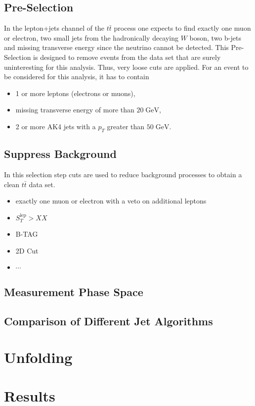 \subsection{Pre-Selection}
\label{sec:PreSel}
	In the lepton+jets channel of the $t\bar{t}$ process one expects to find exactly one muon or electron, two small jets from the hadronically decaying $W$ boson, two b-jets and missing transverse energy since the neutrino cannot be detected. This Pre-Selection is designed to remove events from the data set that are surely uninteresting for this analysis. Thus, very loose cuts are applied. For an event to be considered for this analysis, it has to contain
	\begin{itemize}
	\item 1 or more leptons (electrons or muons),
	\item missing transverse energy of more than $20\;\text{GeV}$,
	\item 2 or more AK4 jets with a $p_T$ greater than $50\;\text{GeV}$.
	\end{itemize}
	
\subsection{Suppress Background}
\label{sec:BackSel}
	In this selection step cuts are used to reduce background processes to obtain a clean $t\bar{t}$ data set. 
	\begin{itemize}
	\item exactly one muon or electron with a veto on additional leptons
	\item $S_T^\text{lep} > XX$
	\item B-TAG
	\item 2D Cut
	\item $\cdots$
	\end{itemize}
\subsection{Measurement Phase Space}
\label{sec:FinalSel}
\subsection{Comparison of Different Jet Algorithms}

\section{Unfolding}
\section{Results}

